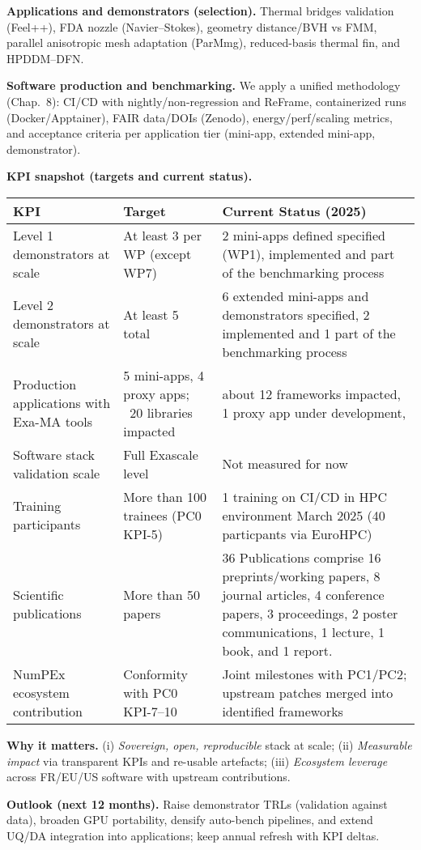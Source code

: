 \medskip
\noindent
\textbf{Applications and demonstrators (selection).}
Thermal bridges validation (Feel++), FDA nozzle (Navier–Stokes), geometry distance/BVH vs FMM,
parallel anisotropic mesh adaptation (ParMmg), reduced-basis thermal fin, and HPDDM–DFN. %

\medskip
\noindent
\textbf{Software production and benchmarking.}
We apply a unified methodology (Chap.~8): CI/CD with nightly/non-regression and ReFrame,
containerized runs (Docker/Apptainer), FAIR data/DOIs (Zenodo), energy/perf/scaling metrics,
and acceptance criteria per application tier (mini-app, extended mini-app, demonstrator). %

\medskip
\noindent
\textbf{KPI snapshot (targets and current status).}
\begin{center}
\begin{tabular}{p{3cm} p{3cm} p{4cm}}
\toprule
\textbf{KPI} & \textbf{Target} & \textbf{Current Status (2025)} \\
\midrule
Level 1 demonstrators at scale & At least 3 per WP (except WP7) & 2 mini-apps defined specified (WP1), implemented and  part of the benchmarking process \\
Level 2 demonstrators at scale & At least 5 total &  6 extended mini-apps and demonstrators specified, 2 implemented and 1 part of the benchmarking process \\
Production applications with Exa-MA tools & 5 mini-apps, 4 proxy apps; ~20 libraries impacted &  about 12 frameworks impacted, 1 proxy app under development, \\
Software stack validation scale & Full Exascale level & Not measured for now \\
Training participants & More than 100 trainees (PC0 KPI-5) &  1 training on CI/CD in HPC environment March 2025 (40 particpants via EuroHPC)\\
Scientific publications & More than 50 papers & 36 Publications comprise 16 preprints/working papers, 8 journal articles, 4 conference papers, 3 proceedings, 2 poster communications, 1 lecture, 1 book, and 1 report. \\
NumPEx ecosystem contribution & Conformity with PC0 KPI-7--10 & Joint milestones with PC1/PC2; upstream patches merged into identified frameworks \\
\bottomrule
\end{tabular}
\end{center}

\medskip
\noindent
\textbf{Why it matters.} (i) \emph{Sovereign, open, reproducible} stack at scale; (ii) \emph{Measurable
impact} via transparent KPIs and re-usable artefacts; (iii) \emph{Ecosystem leverage} across FR/EU/US
software with upstream contributions.

\medskip
\noindent
\textbf{Outlook (next 12 months).}
Raise demonstrator TRLs (validation against data), broaden GPU portability, densify auto-bench
pipelines, and extend UQ/DA integration into applications; keep annual refresh with KPI deltas.


